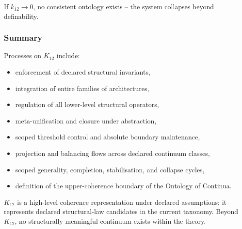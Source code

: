 If $k_{12} \to 0$,
no consistent ontology exists -- the system collapses beyond definability.

\subsubsection{Summary}

Processes on $K_{12}$ include:
\begin{itemize}
    \item enforcement of declared structural invariants,
    \item integration of entire families of architectures,
    \item regulation of all lower-level structural operators,
    \item meta-unification and closure under abstraction,
    \item scoped threshold control and absolute boundary maintenance,
    \item projection and balancing flows across declared continuum classes,
    \item scoped generality, completion, stabilisation, and collapse cycles,
    \item definition of the upper-coherence boundary of the Ontology of Continua.
\end{itemize}

$K_{12}$ is a high-level coherence representation under declared assumptions; it represents declared structural-law candidates in the current taxonomy.
Beyond $K_{12}$, no structurally meaningful continuum exists within the theory.

